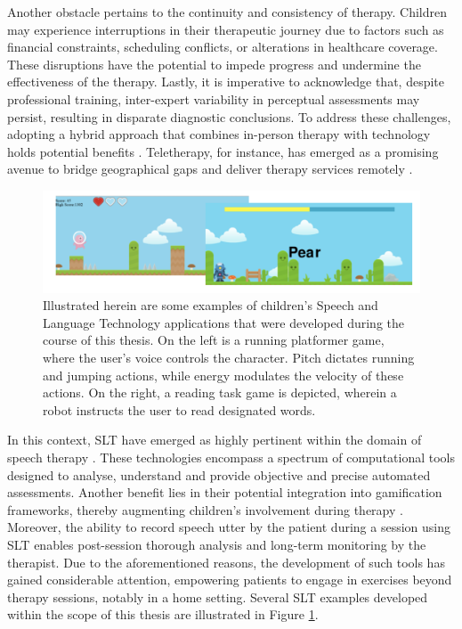 Another obstacle pertains to the continuity and consistency of therapy. Children may experience interruptions in their therapeutic journey due to factors such as financial constraints, scheduling conflicts, or alterations in healthcare coverage. These disruptions have the potential to impede progress and undermine the effectiveness of the therapy. Lastly, it is imperative to acknowledge that, despite professional training, inter-expert variability in perceptual assessments may persist, resulting in disparate diagnostic conclusions. To address these challenges, adopting a hybrid approach that combines in-person therapy with technology holds potential benefits \cite{hilty2015new,barnett2011utilizing}. Teletherapy, for instance, has emerged as a promising avenue to bridge geographical gaps and deliver therapy services remotely \cite{hughes2019increasing}.

\begin{figure}
    \centering
    \includegraphics[width=1\textwidth]{imgs/exampleSLT.png}
    \caption{Illustrated herein are some examples of children's Speech and Language Technology applications that were developed during the course of this thesis. On the left is a running platformer game, where the user's voice controls the character. Pitch dictates running and jumping actions, while energy modulates the velocity of these actions. On the right, a reading task game is depicted, wherein a robot instructs the user to read designated words.}
    \label{fig:exSLT}

\end{figure}

In this context, \ac{SLT} have emerged as highly pertinent within the domain of speech therapy \cite{mendoza2022added}. These technologies encompass a spectrum of computational tools designed to analyse, understand and provide objective and precise automated assessments. Another benefit lies in their potential integration into gamification frameworks, thereby augmenting children's involvement during therapy \cite{brewer2013using}. Moreover, the ability to record speech utter by the patient during a session using \ac{SLT} enables post-session thorough analysis and long-term monitoring by the therapist. Due to the aforementioned reasons, the development of such tools has gained considerable attention, empowering patients to engage in exercises beyond therapy sessions, notably in a home setting. Several \ac{SLT} examples developed within the scope of this thesis are illustrated in Figure \ref{fig:exSLT}.

